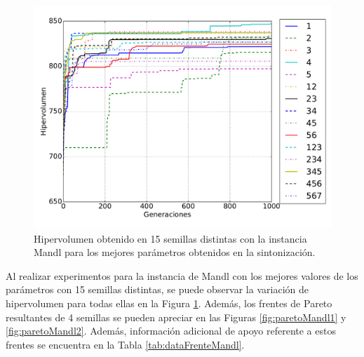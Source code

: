\begin{figure}[!htb]
\centering
\includegraphics[width=\textwidth]{img/hyp_Mandl}
\caption{Hipervolumen obtenido en 15 semillas distintas con la instancia Mandl para los mejores parámetros obtenidos en la sintonización.}
\label{fig:hyp_mandl}
\end{figure}

Al realizar experimentos para la instancia de Mandl con los mejores valores de los parámetros con 15 semillas distintas, se puede observar la variación de hipervolumen para todas ellas en la Figura \ref{fig:hyp_mandl}. Además, los frentes de Pareto resultantes de 4 semillas se pueden apreciar en las Figuras \ref{fig:paretoMandl1} y \ref{fig:paretoMandl2}. Además, información adicional de apoyo referente a estos frentes se encuentra en la Tabla \ref{tab:dataFrenteMandl}. 

